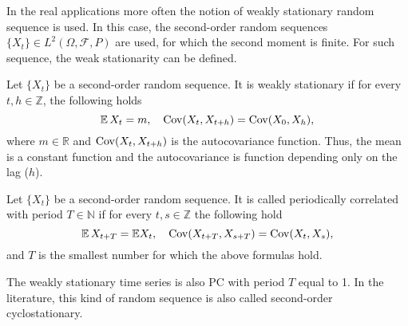In the real applications more often the notion of weakly stationary random sequence is used.  In this case, the second-order random sequences $\{X_t\}\in L^2(\Omega,\mathcal{F},P)$ are used, for which the second moment is finite.  For such sequence, the weak stationarity can be defined.
\begin{definition}\label{def3}
\cite{brockwell2016introduction} Let $\{X_t\}$ be a second-order random sequence. It is weakly stationary if for every $t,h\in \mathbb{Z}$, the following holds
\begin{equation*}
    \operatorname{\mathbb{E}} X_t=m, \quad \operatorname{Cov}(X_t,X_{t+h})=\operatorname{Cov}(X_0,X_{h}),
\end{equation*}
where $m \in \mathbb{R}$ and $\operatorname{Cov}(X_t,X_{t+h})$ is the autocovariance function. Thus, the mean is a constant function and the autocovariance is function depending only on the lag ($h$).
\end{definition}
\begin{definition}\label{def4}\cite{hurd2007periodically,gladyshev}
Let $\{X_t\}$ be a second-order random sequence. It is called periodically correlated with period $T \in \mathbb{N}$ if for every $t,s\in \mathbb{Z}$ the following hold
\begin{equation}
\label{eq:PC def}
    \operatorname{\mathbb{E}} X_{t+T}=\mathbb{E}X_{t}, \quad \operatorname{Cov}(X_{t+T},X_{s+T})=\operatorname{Cov}(X_{t},X_{s}),
\end{equation}
and $T$ is the smallest number for which the above formulas hold.
\end{definition}
The weakly stationary time series is also PC with period $T$ equal to 1. In the literature, this kind of random sequence is also called second-order cyclostationary.

